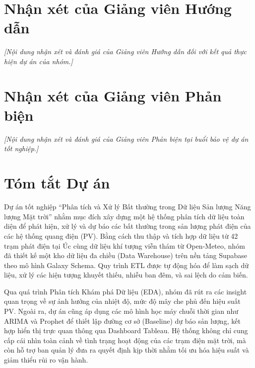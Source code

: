 \documentclass[12pt, a4paper]{report}
\begin{document}
\chapter*{Nhận xét của Giảng viên Hướng dẫn}
\textit{[Nội dung nhận xét và đánh giá của Giảng viên Hướng dẫn đối với kết quả thực hiện dự án của nhóm.]}

\chapter*{Nhận xét của Giảng viên Phản biện}
\textit{[Nội dung nhận xét và đánh giá của Giảng viên Phản biện tại buổi bảo vệ dự án tốt nghiệp.]}

\chapter*{Tóm tắt Dự án}
Dự án tốt nghiệp ``Phân tích và Xử lý Bất thường trong Dữ liệu Sản lượng Năng lượng Mặt trời'' nhằm mục đích xây dựng một hệ thống phân tích dữ liệu toàn diện để phát hiện, xử lý và dự báo các bất thường trong sản lượng phát điện của các hệ thống quang điện (PV). 
Bằng cách thu thập và tích hợp dữ liệu từ 42 trạm phát điện tại Úc cùng dữ liệu khí tượng viễn thám từ Open-Meteo, nhóm đã thiết kế một kho dữ liệu đa chiều (Data Warehouse) trên nền tảng Supabase theo mô hình Galaxy Schema. Quy trình ETL được tự động hóa để làm sạch dữ liệu, xử lý các hiện tượng khuyết thiếu, nhiễu ban đêm, và sai lệch do cảm biến. 

Qua quá trình Phân tích Khám phá Dữ liệu (EDA), nhóm đã rút ra các insight quan trọng về sự ảnh hưởng của nhiệt độ, mức độ mây che phủ đến hiệu suất PV. Ngoài ra, dự án cũng áp dụng các mô hình học máy chuỗi thời gian như ARIMA và Prophet để thiết lập đường cơ sở (Baseline) dự báo sản lượng, kết hợp hiển thị trực quan thông qua Dashboard Tableau. Hệ thống không chỉ cung cấp cái nhìn toàn cảnh về tình trạng hoạt động của các trạm điện mặt trời, mà còn hỗ trợ ban quản lý đưa ra quyết định kịp thời nhằm tối ưu hóa hiệu suất và giảm thiểu rủi ro vận hành.
\end{document}
